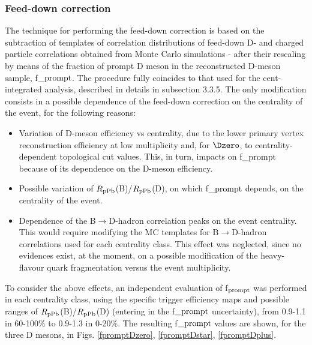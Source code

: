 \subsubsection{Feed-down correction}
The technique for performing the feed-down correction is based on the subtraction of templates of correlation distributions of feed-down D- and charged particle correlations obtained from Monte Carlo simulations - after their rescaling by means of the fraction of prompt D meson in the reconstructed D-meson sample, f$\_{\rm prompt}$.
The procedure fully coincides to that used for the cent-integrated analysis, described in details in subsection 3.3.5.
The only modification consists in a possible dependence of the feed-down correction on the centrality of the event, for the following reasons:
\begin{itemize}
  \item Variation of D-meson efficiency vs centrality, due to the lower primary vertex reconstruction efficiency at low multiplicity and, for $\Dzero$, to centrality-dependent topological cut values. This, in turn, impacts on f$\_{\rm prompt}$ because of its dependence on the D-meson efficiency.
  \item Possible variation of $R_{\rm pPb}$(B)/$R_{\rm pPb}$(D), on which f$\_{\rm prompt}$ depends, on the centrality of the event.
  \item Dependence of the B$\rightarrow$D-hadron correlation peaks on the event centrality. This would require modifying the MC templates for B$\rightarrow$D-hadron correlations used for each centrality class. This effect was neglected, since no evidences exist, at the moment, on a possible modification of the heavy-flavour quark fragmentation versus the event multiplicity.
\end{itemize}
To consider the above effects, an independent evaluation of f$_{\rm prompt}$ was performed in each centrality class, using the specific trigger efficiency maps and possible ranges of $R_{\rm pPb}$(B)/$R_{\rm pPb}$(D) (entering in the f$\_{\rm prompt}$ uncertainty), from 0.9-1.1 in 60-100\% to 0.9-1.3 in 0-20\%.
The resulting f$\_{\rm prompt}$ values are shown, for the three D mesons, in Figs. \ref{fpromptDzero}, \ref{fpromptDstar}, \ref{fpromptDplus}.


